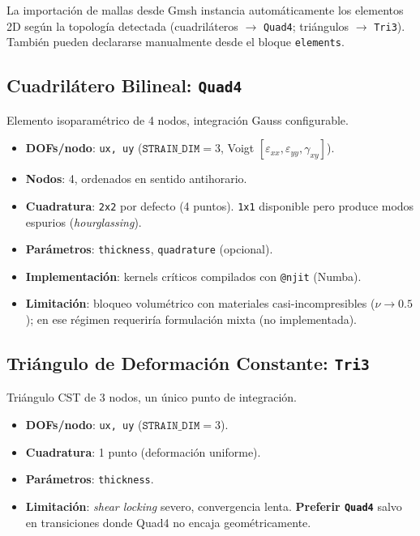 \documentclass[11pt,oneside]{report}
\begin{document}
La importación de mallas desde Gmsh instancia automáticamente los elementos 2D según la topología detectada (cuadriláteros \ensuremath{\to} \texttt{Quad4}; triángulos \ensuremath{\to} \texttt{Tri3}). También pueden declararse manualmente desde el bloque \texttt{elements}.

\subsection{Cuadrilátero Bilineal: \texttt{Quad4}}

Elemento isoparamétrico de 4 nodos, integración Gauss configurable.

\begin{itemize}
  \item \textbf{DOFs/nodo}: \texttt{ux, uy} ($\texttt{STRAIN\_DIM} = 3$, Voigt $[\varepsilon_{xx}, \varepsilon_{yy}, \gamma_{xy}]$).
  \item \textbf{Nodos}: 4, ordenados en sentido antihorario.
  \item \textbf{Cuadratura}: \texttt{\textquotedbl{}2x2\textquotedbl{}} por defecto (4 puntos). \texttt{\textquotedbl{}1x1\textquotedbl{}} disponible pero produce modos espurios (\textit{hourglassing}).
  \item \textbf{Parámetros}: \texttt{thickness}, \texttt{quadrature} (opcional).
  \item \textbf{Implementación}: kernels críticos compilados con \texttt{@njit} (Numba).
  \item \textbf{Limitación}: bloqueo volumétrico con materiales casi-incompresibles ($\nu \to 0.5$); en ese régimen requeriría formulación mixta (no implementada).
\end{itemize}

\subsection{Triángulo de Deformación Constante: \texttt{Tri3}}

Triángulo CST de 3 nodos, un único punto de integración.

\begin{itemize}
  \item \textbf{DOFs/nodo}: \texttt{ux, uy} ($\texttt{STRAIN\_DIM} = 3$).
  \item \textbf{Cuadratura}: 1 punto (deformación uniforme).
  \item \textbf{Parámetros}: \texttt{thickness}.
  \item \textbf{Limitación}: \textit{shear locking} severo, convergencia lenta. \textbf{Preferir \texttt{Quad4}} salvo en transiciones donde Quad4 no encaja geométricamente.
\end{itemize}
\end{document}
